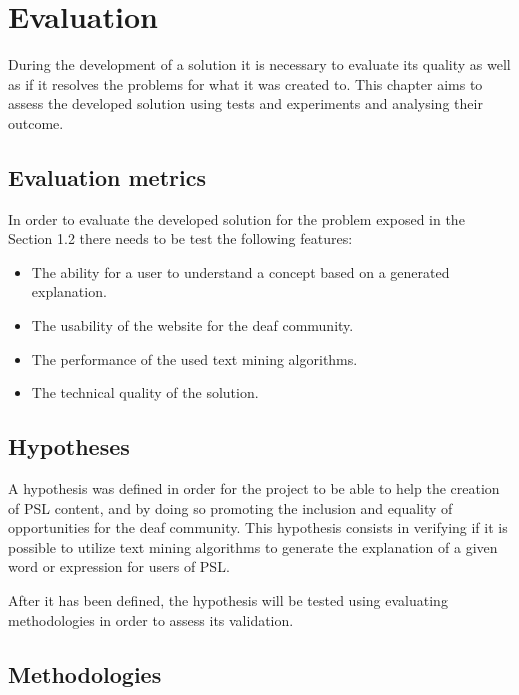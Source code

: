 
\chapter{Evaluation} %
\label{chap:Chapter6} 

During the development of a solution it is necessary to evaluate its quality as well as if it resolves the problems for what it was created to.
This chapter aims to assess the developed solution using tests and experiments and analysing their outcome.

\section{Evaluation metrics}

In order to evaluate the developed solution for the problem exposed in the Section 1.2 there needs to be test the following features: 

\begin{itemize}
    \item The ability for a user to understand a concept based on a generated explanation.
    \item The usability of the website for the deaf community.
    \item The performance of the used text mining algorithms.
    \item The technical quality of the solution.
\end{itemize}

\section{Hypotheses}

A hypothesis was defined in order for the project to be able to help the creation of \gls{PSL} content, and by doing so promoting the inclusion and equality of opportunities for the deaf community.
This hypothesis consists in verifying if it is possible to utilize text mining algorithms to generate the explanation of a given word or expression for users of \gls{PSL}.

After it has been defined, the hypothesis will be tested using evaluating methodologies in order to assess its validation.

\section{Methodologies}


